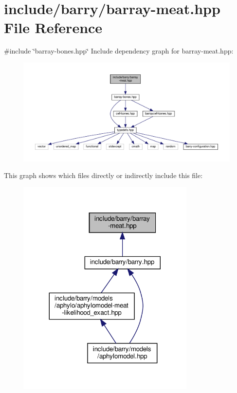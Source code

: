 \hypertarget{barray-meat_8hpp}{}\section{include/barry/barray-\/meat.hpp File Reference}
\label{barray-meat_8hpp}
{\ttfamily \#include \char`\"{}barray-\/bones.\+hpp\char`\"{}}\newline
Include dependency graph for barray-\/meat.hpp\+:\nopagebreak
\begin{figure}[H]
\begin{center}
\leavevmode
\includegraphics[width=350pt]{barray-meat_8hpp__incl}
\end{center}
\end{figure}
This graph shows which files directly or indirectly include this file\+:
\nopagebreak
\begin{figure}[H]
\begin{center}
\leavevmode
\includegraphics[width=251pt]{barray-meat_8hpp__dep__incl}
\end{center}
\end{figure}

